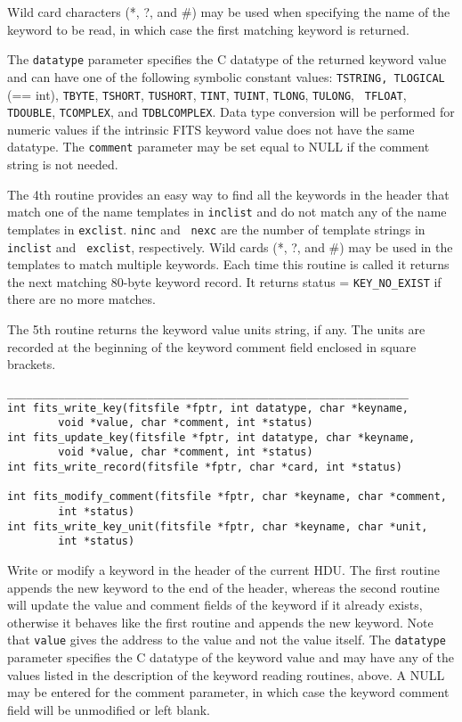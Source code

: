 \documentclass[11pt]{article}
\begin{document}
Wild card characters (*, ?, and \#) may be used when specifying the name
of the keyword to be read, in which case the first matching keyword is
returned.

The {\tt datatype} parameter specifies the C datatype of the returned
keyword value and can have one of the following symbolic constant
values:  {\tt TSTRING, TLOGICAL} (== int), {\tt TBYTE}, {\tt TSHORT},
{\tt TUSHORT}, {\tt TINT}, {\tt TUINT}, {\tt TLONG}, {\tt TULONG}, {\tt
TFLOAT}, {\tt TDOUBLE}, {\tt TCOMPLEX}, and {\tt TDBLCOMPLEX}.  Data
type conversion will be performed for numeric values if the intrinsic
FITS keyword value does not have the same datatype.  The {\tt comment}
parameter may be set equal to NULL if the comment string is not
needed.

The 4th routine provides an easy way to find all the keywords in the
header that match one of the name templates in {\tt inclist} and do not
match any of the name templates in {\tt exclist}.  {\tt ninc} and {\tt
nexc} are the number of template strings in {\tt inclist} and {\tt
exclist}, respectively.  Wild cards (*, ?, and \#) may be used in the
templates to match multiple keywords.  Each time this routine is called
it returns the next matching 80-byte keyword record.  It returns status
= {\tt KEY\_NO\_EXIST} if there are no more matches.

The 5th routine returns the keyword value units string, if any.
The units are recorded at the beginning of the keyword comment field
enclosed in square brackets.
\begin{verbatim}
_______________________________________________________________
int fits_write_key(fitsfile *fptr, int datatype, char *keyname, 
        void *value, char *comment, int *status)
int fits_update_key(fitsfile *fptr, int datatype, char *keyname,
        void *value, char *comment, int *status)
int fits_write_record(fitsfile *fptr, char *card, int *status)

int fits_modify_comment(fitsfile *fptr, char *keyname, char *comment,
        int *status)
int fits_write_key_unit(fitsfile *fptr, char *keyname, char *unit,
        int *status)

\end{verbatim}

Write or modify a keyword  in the header of the current HDU.  The
first routine appends the new keyword to the end of the header, whereas
the second routine will update the value and comment fields of the
keyword if it already exists, otherwise it behaves like the first
routine and appends the new keyword.  Note that {\tt value} gives the
address to the value and not the value itself.  The {\tt datatype}
parameter specifies the C datatype of the keyword value and may have
any of the values listed in the description of the keyword reading
routines, above.  A NULL may be entered for the comment parameter, in
which case the  keyword comment field will be unmodified or left
blank.
\end{document}
